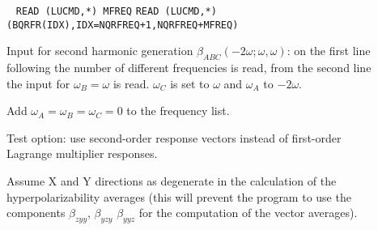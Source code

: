 \begin{description}
 
\item[]  \verb| |\newline
   \verb|READ (LUCMD,*) MFREQ|\newline
   \verb|READ (LUCMD,*) (BQRFR(IDX),IDX=NQRFREQ+1,NQRFREQ+MFREQ)|

   Input for second harmonic generation
   $\beta_{ABC}(-2\omega;\omega,\omega)$:
   on the first line following  the number of different
   frequencies is read, from the second line the input for 
   $\omega_B = \omega$ is read. $\omega_C$ is set to $\omega$ 
   and $\omega_A$ to $-2\omega$.

\item[] 
   Add $\omega_A = \omega_B = \omega_C = 0$ to the frequency list.

\item[] 
Test option: use second-order response vectors instead of
first-order Lagrange multiplier responses.
 
\item[] 
Assume X and Y directions as degenerate in the calculation
of the hyperpolarizability averages (this will prevent
the program to use the components $\beta_{zyy}$, $\beta_{yzy}$
$\beta_{yyz}$ for the computation of the vector averages).

\end{description}
